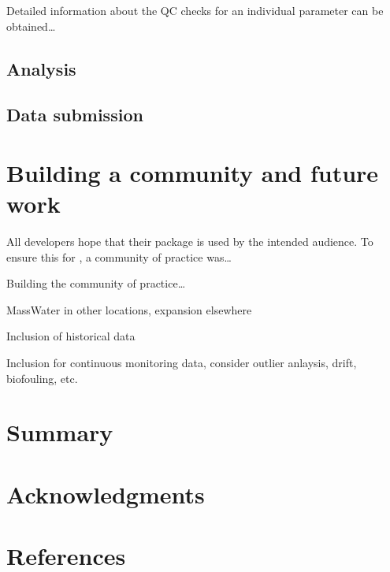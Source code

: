 Detailed information about the QC checks for an individual parameter can be obtained\ldots{}

\hypertarget{analysis}{%
\subsection{Analysis}\label{analysis}}

\hypertarget{data-submission}{%
\subsection{Data submission}\label{data-submission}}

\hypertarget{building-a-community-and-future-work}{%
\section{Building a community and future work}\label{building-a-community-and-future-work}}

All developers hope that their package is used by the intended audience. To ensure this for , a community of practice was\ldots{}

Building the community of practice\ldots{}

MassWater in other locations, expansion elsewhere

Inclusion of historical data

Inclusion for continuous monitoring data, consider outlier anlaysis, drift, biofouling, etc.

\hypertarget{summary}{%
\section{Summary}\label{summary}}

\hypertarget{acknowledgments}{%
\section{Acknowledgments}\label{acknowledgments}}

\hypertarget{references}{%
\section*{References}\label{references}}


